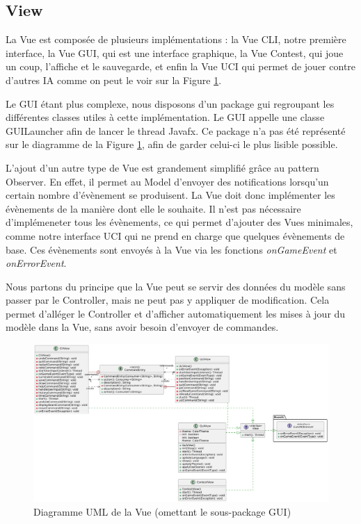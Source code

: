 \documentclass{article}
\begin{document}
\subsection{View}
La Vue est composée de plusieurs implémentations : la Vue CLI, notre première interface, la Vue GUI, qui est une interface graphique, la Vue Contest, qui joue un coup, l'affiche et le sauvegarde,
et enfin la Vue UCI qui permet de jouer contre d'autres IA comme on peut le voir sur la Figure \ref{umlView}.

Le GUI étant plus complexe, nous disposons d'un package gui regroupant les différentes classes utiles à cette implémentation. Le GUI appelle une classe GUILauncher afin de lancer
le thread Javafx. Ce package n'a pas été représenté sur le diagramme de la Figure \ref{umlView}, afin de garder celui-ci le plus lisible possible.

L'ajout d'un autre type de Vue est grandement simplifié grâce au pattern Observer. En effet, il permet au Model d'envoyer des notifications lorsqu'un certain nombre d'évènement
se produisent. La Vue doit donc implémenter les évènements de la manière dont elle le souhaite. Il n'est pas nécessaire d'implémeneter tous les évènements, ce qui permet d'ajouter des Vues minimales,
comme notre interface UCI qui ne prend en charge que quelques évènements de base. Ces évènements sont envoyés à la Vue via les fonctions \textit{onGameEvent} et \textit{onErrorEvent}.

Nous partons du principe que la Vue peut se servir des données du modèle sans passer par le Controller, mais ne peut pas y appliquer de modification. Cela permet d'alléger le Controller
et d'afficher automatiquement les mises à jour du modèle dans la Vue, sans avoir besoin d'envoyer de commandes.

\begin{figure}[h]
    \centering
    \includegraphics[width=\textwidth]{uml_view}
    \caption{Diagramme UML de la Vue (omettant le sous-package GUI)}
    \label{umlView}
\end{figure}
\FloatBarrier
\end{document}
